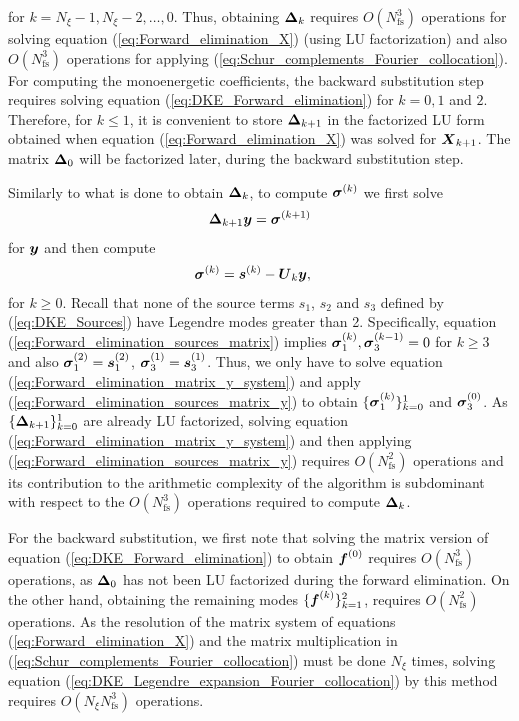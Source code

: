 for $k=N_\xi-1, N_\xi-2, \ldots, 0$. Thus, obtaining $\vb*{\Delta}_k$ requires $O(N_{\text{fs}}^3)$ operations for solving equation (\ref{eq:Forward_elimination_X}) (using LU factorization) and also $O(N_{\text{fs}}^3)$ operations for applying (\ref{eq:Schur_complements_Fourier_collocation}). For computing the monoenergetic coefficients, the backward substitution step requires solving equation (\ref{eq:DKE_Forward_elimination}) for $k=0,1$ and $2$. Therefore, for $k\le 1$, it is convenient to store $\vb*{\Delta}_{k+1}$ in the factorized LU form obtained when equation (\ref{eq:Forward_elimination_X}) was solved for $\vb*{X}_{k+1}$. The matrix $\vb*{\Delta}_{0}$ will be factorized later, during the backward substitution step.
	
Similarly to what is done to obtain $\vb*{\Delta}_k$, to compute $\vb*{\sigma}^{(k)}$ we first solve 
%
\begin{align}
	\vb*{\Delta}_{k+1} \vb*{y} = \vb*{\sigma}^{(k+1)}
	\label{eq:Forward_elimination_matrix_y_system}
\end{align}
for $\vb*{y}$ and then compute
%
\begin{align}
	\vb*{\sigma}^{(k)} & = \vb*{s}^{(k)} - \vb*{U}_{k}  \vb*{y},
	\label{eq:Forward_elimination_sources_matrix_y}
\end{align}
%
for $k\ge 0$. Recall that none of the source terms $s_1$, $s_2$ and $s_3$ defined by (\ref{eq:DKE_Sources}) have Legendre modes greater than 2. Specifically, equation (\ref{eq:Forward_elimination_sources_matrix}) implies $\vb*{\sigma}_1^{(k)}, \vb*{\sigma}_3^{(k-1)} = 0$ for $k\ge 3$ and also $\vb*{\sigma}_1^{(2)} = \vb*{s}_1^{(2)}$, $\vb*{\sigma}_3^{(1)} = \vb*{s}_3^{(1)}$. Thus, we only have to solve equation (\ref{eq:Forward_elimination_matrix_y_system}) and apply (\ref{eq:Forward_elimination_sources_matrix_y}) to obtain $\{\vb*{\sigma}_1^{(k)}\}_{k=0}^{1}$ and $\vb*{\sigma}_3^{(0)}$. As $\{\vb*{\Delta}_{k+1}\}_{k=0}^{1}$ are already LU factorized, solving equation (\ref{eq:Forward_elimination_matrix_y_system}) and then applying (\ref{eq:Forward_elimination_sources_matrix_y}) requires $O(N_{\text{fs}}^2)$ operations and its contribution to the arithmetic complexity of the algorithm is subdominant with respect to the $O(N_{\text{fs}}^3)$ operations required to compute $\vb*{\Delta}_k$.

For the backward substitution, we first note that solving the matrix version of equation (\ref{eq:DKE_Forward_elimination}) to obtain $\vb*{f}^{(0)}$ requires $O(N_{\text{fs}}^3)$ operations, as $\vb*{\Delta}_0$ has not been LU factorized during the forward elimination. On the other hand, obtaining the remaining modes  $\{\vb*{f}^{(k)}\}_{k=1}^{2}$, requires $O(N_{\text{fs}}^2)$ operations. As the resolution of the matrix system of equations (\ref{eq:Forward_elimination_X}) and the matrix multiplication in (\ref{eq:Schur_complements_Fourier_collocation}) must be done $N_\xi$ times, solving equation (\ref{eq:DKE_Legendre_expansion_Fourier_collocation}) by this method requires $O(N_\xi N_{\text{fs}}^3)$ operations.


